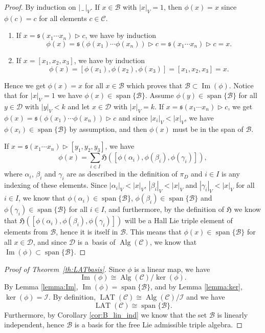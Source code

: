 \documentclass[10pt,a4paper]{amsart}
\newcommand{\Img}{\operatorname{Im}}
\newcommand*{\LAT}{\operatorname{LAT}}
\newcommand*{\Alg}{\operatorname{Alg}}
\newcommand{\spn}{\operatorname{span}}
\newcommand{\I}{\mathcal{I}}
\newcommand{\noarg}{\,\_\,}
\numberwithin{equation}{section}
\begin{document}
\begin{proof}
By induction on $|\noarg |_V$. %
If $x \in \mathcal{B}$ with $|x|_V=1$, then $\phi(x) = x$ since $\phi(c)=c$ for all elements $c \in \mathcal{C}$. %
\begin{enumerate}\itemsep=0pt
 \item[(i)] If $x = \mathfrak{s}(x_1 \cdots x_n) \rhd c$, we have by induction
 \[
 \phi(x) = \mathfrak{s}(\phi(x_1) \cdots \phi(x_n))\rhd c = \mathfrak{s}(x_1 \cdots x_n) \rhd c = x.
 \]
 \item[(ii)] If $x = [x_1, x_2, x_3]$, we have by induction
 \[
 \phi(x) = [\phi(x_1),\phi(x_2),\phi(x_3)] = [x_1, x_2, x_3] = x.
 \]
\end{enumerate}
Hence we get $\phi(x)=x$ for all $x \in \mathcal{B}$ which proves that $\mathcal{B} \subset \Img(\phi)$.
Notice that for $|x|_V=1$ we have $\phi(x) \in \spn\{\mathcal{B} \}$. Assume $\phi(y) \in \spn \{\mathcal{B}\}$ for all $y\in \mathcal{D}$ with $|y|_V < k$ and let $x \in \mathcal{D}$ with $|x|_V=k$. If $x = \mathfrak{s}(x_1 \cdots x_n) \rhd c$, we get $\phi(x) = \mathfrak{s}( \phi(x_1) \cdots \phi(x_n)) \rhd c$ and since $|x_i|_V < |x|_V$, we have $\phi(x_i) \in \spn\{ \mathcal{B} \}$ by assumption, and then $\phi(x)$ must be in the span of $\mathcal{B}$.

If $x = \mathfrak{s}(x_1 \cdots x_n) \rhd [y_1, y_2 ,y_3]$, we have
\[
\phi(x) = \sum_{i \in I} \mathfrak{H}([\phi(\alpha_i), \phi(\beta_i), \phi(\gamma_i)]),
\]
where $\alpha_i$, $\beta_i$ and $\gamma_i$ are as described in the definition of $\pi_D$ and $i\in I$ is any indexing of these elements. Since $|\alpha_i|_V<|x|_V$, $|\beta_i|_V<|x|_V$ and $|\gamma_i|_V<|x|_V$ for all $i \in I$, we know that $\phi(\alpha_i) \in \spn \{ \mathcal{B} \}$, $\phi(\beta_i) \in \spn \{ \mathcal{B} \}$ and $\phi(\gamma_i) \in \spn \{ \mathcal{B} \}$ for all $i \in I$, and furthermore, by the definition of $\mathfrak{H}$ we know that $\mathfrak{H}([\phi(\alpha_i), \phi(\beta_i), \phi(\gamma_i)])$ will be a Hall Lie triple element of elements from $\mathcal{B}$, hence it is itself in $\mathcal{B}$.
This means that $\phi(x) \in \spn \{\mathcal{B}\}$ for all $x \in \mathcal{D}$, and since $\mathcal{D}$ is a~basis of $\Alg(\mathcal{C})$, we know that $\Img(\phi) \subset \spn \{\mathcal{B}\}$.
\end{proof}


\begin{proof}[Proof of Theorem~\ref{th:LATbasis}]%
Since $\phi$ is a linear map, we have
\[
\Img(\phi) \cong \Alg(\mathcal{C})/\ker(\phi).
\]
By Lemma \ref{lemma:Im}, $\Img(\phi) = \spn \{\mathcal{B} \}$, and by Lemma \ref{lemma:ker}, $\ker(\phi) = \I$. By definition, $\LAT(\mathcal{C}) \cong \Alg(\mathcal{C})/ \I$ and we have
\[
\LAT(\mathcal{C}) \cong \spn \{ \mathcal{B} \}.
\]
Furthermore, by Corollary \ref{cor:B_lin_ind} we know that the set $\mathcal{B}$ is linearly independent, hence $\mathcal{B}$ is a basis for the free Lie admissible triple algebra.
\end{proof}
\end{document}
